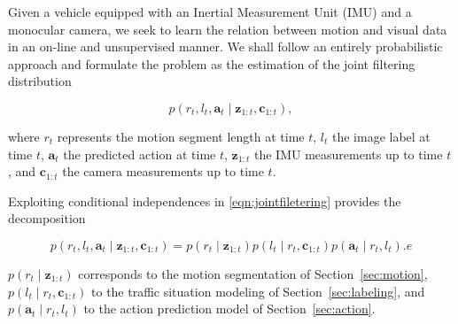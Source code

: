 Given a vehicle equipped with an Inertial Measurement Unit (IMU) and a monocular
camera, we seek to learn the relation between motion and visual data in an
on-line and unsupervised manner. We shall follow an entirely probabilistic
approach and formulate the problem as the estimation of the joint filtering
distribution

\begin{equation}
\label{eqn:jointfiletering}
p(r_t,l_t,\mathbf{a}_t\mid\mathbf{z}_{1:t},\mathbf{c}_{1:t}),
\end{equation}

where $r_t$ represents the motion segment length at time $t$, $l_t$ the image
label at time $t$, $\mathbf{a}_t$ the predicted action at time $t$,
$\mathbf{z}_{1:t}$ the IMU measurements up to time $t$, and $\mathbf{c}_{1:t}$
the camera measurements up to time $t$.

Exploiting conditional independences in \eqref{eqn:jointfiletering} provides the
decomposition

\begin{equation}
\label{eqn:jointdecomposition}
p(r_t,l_t,\mathbf{a}_t\mid\mathbf{z}_{1:t},\mathbf{c}_{1:t})=
p(r_t\mid\mathbf{z}_{1:t})p(l_t\mid r_t,\mathbf{c}_{1:t})
p(\mathbf{a}_t\mid r_t,l_t).e
\end{equation}

$p(r_t\mid\mathbf{z}_{1:t})$ corresponds to the motion segmentation of
Section~\ref{sec:motion}, $p(l_t\mid r_t,\mathbf{c}_{1:t})$ to the traffic situation
modeling of Section~\ref{sec:labeling}, and $p(\mathbf{a}_t\mid r_t,l_t)$ to the action
prediction model of Section~\ref{sec:action}.
